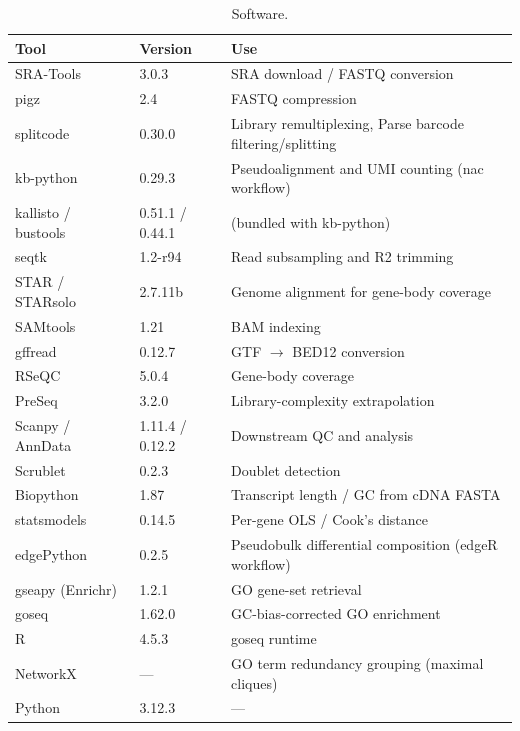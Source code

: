 \begin{table}[ht]
\centering
\caption{Software.}
\label{tab:software}
\begin{tabular}{lll}
\hline
Tool & Version & Use \\
\hline
SRA-Tools~\cite{leinonen2011sra} & 3.0.3 & SRA download / FASTQ conversion \\
pigz & 2.4 & FASTQ compression \\
splitcode~\cite{sullivan2024splitcode} & 0.30.0 & Library remultiplexing, Parse barcode filtering/splitting \\
kb-python~\cite{sullivan2023kb} & 0.29.3 & Pseudoalignment and UMI counting (nac workflow) \\
\quad kallisto / bustools~\cite{bray2016kallisto,melsted2021bustools} & 0.51.1 / 0.44.1 & (bundled with kb-python) \\
seqtk~\cite{seqtk} & 1.2-r94 & Read subsampling and R2 trimming \\
STAR / STARsolo~\cite{dobin2013star} & 2.7.11b & Genome alignment for gene-body coverage \\
SAMtools~\cite{danecek2021samtools} & 1.21 & BAM indexing \\
gffread~\cite{pertea2020gffread} & 0.12.7 & GTF $\rightarrow$ BED12 conversion \\
RSeQC~\cite{wang2012rseqc} & 5.0.4 & Gene-body coverage \\
PreSeq~\cite{daley2013preseq} & 3.2.0 & Library-complexity extrapolation \\
Scanpy / AnnData~\cite{wolf2018scanpy,virshup2024anndata} & 1.11.4 / 0.12.2 & Downstream QC and analysis \\
Scrublet~\cite{wolock2019scrublet} & 0.2.3 & Doublet detection \\
Biopython~\cite{cock2009biopython} & 1.87 & Transcript length / GC from cDNA FASTA \\
statsmodels~\cite{seabold2010statsmodels} & 0.14.5 & Per-gene OLS / Cook's distance \\
edgePython~\cite{robinson2010edger,robinson2010tmm,chen2016edger} & 0.2.5 & Pseudobulk differential composition (edgeR workflow) \\
gseapy (Enrichr)~\cite{fang2023gseapy,kuleshov2016enrichr} & 1.2.1 & GO gene-set retrieval \\
goseq~\cite{young2010goseq} & 1.62.0 & GC-bias-corrected GO enrichment \\
R~\cite{rcoreteam} & 4.5.3 & goseq runtime \\
NetworkX~\cite{hagberg2008networkx} & --- & GO term redundancy grouping (maximal cliques) \\
Python & 3.12.3 & --- \\
\hline
\end{tabular}
\end{table}

